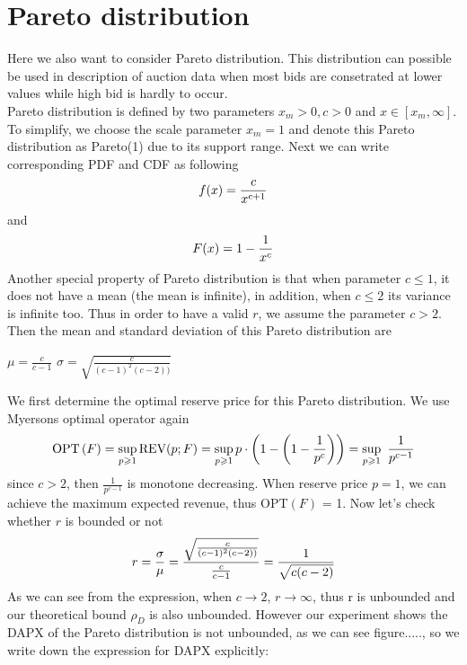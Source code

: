\section{Pareto distribution}
Here we also want to consider Pareto distribution. This distribution can possible be used in description of auction data when most bids are consetrated at lower values while high bid is hardly to occur. \\
Pareto distribution is defined by two parameters $x_m>0, c>0$ and $x \in [x_m, \infty]$. To simplify, we choose the scale parameter $x_m = 1$ and denote this Pareto distribution as Pareto(1) due to its support range. Next we can write corresponding PDF and CDF as following
\begin{equation}\notag
f(x) = \frac{c}{x^{c+1}} 
\end{equation} 
and 
\begin{equation}\notag
F(x) = 1- \frac{1}{x^c}
\end{equation} 
Another special property of Pareto distribution is that when parameter $c \leqslant 1$, it does not have a mean (the mean is infinite), in addition, when $c \leqslant 2$ its variance is infinite too. Thus in order to have a valid $r$, we assume the parameter $c > 2$. Then the mean and standard deviation of this Pareto distribution are
\begin{center}
	$\mu = \frac{c}{c-1} $ \hspace{2cm} $\sigma = \sqrt{\frac{c}{(c-1)^2(c-2))}}$
\end{center}
We first determine the optimal reserve price for this Pareto distribution. We use Myersons optimal operator again
\begin{equation}\notag
\text{OPT}\left(F\right) = \sup_{p \geqslant 1} \text{REV}(p;F) = \sup_{p \geqslant 1} p \cdot \left(1-\left(1- \frac{1}{p^c}\right)\right) =\sup_{p \geqslant 1} \ \frac{1}{p^{c-1}}
\end{equation}
since $c>2$, then $\frac{1}{p^{c-1}}$ is monotone decreasing. When reserve price $p = 1$, we can achieve the maximum expected revenue, thus OPT$(F)$ = 1. Now let's check whether $r$ is bounded or not
\begin{equation}\notag
r = \frac{\sigma}{\mu} = \frac{\sqrt{\frac{c}{(c-1)^2(c-2))}}}{\frac{c}{c-1} } = \frac{1}{\sqrt{c(c-2)}}
\end{equation}
As we can see from the expression, when $c \to 2$, $r \to \infty$, thus r is unbounded and our theoretical bound $\rho_D$ is also unbounded. However our experiment shows the DAPX of the Pareto distribution is not unbounded, as we can see figure....., so we write down the expression for DAPX explicitly:
